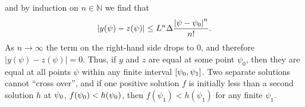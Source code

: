 %
and by induction on $n\in\mathbb{N}$ we find that 
%
\begin{equation}
  \left|y(\psi)-z(\psi)\right| 
  \le
  L^n\Delta\frac{\left|\psi-\psi_0\right|^n}{n!}.
\end{equation}
%
As $n\to\infty$ the term on the right-hand side drops to $0$, and
therefore $|y(\psi)-z(\psi)|=0$. Thus, if $y$ and $z$ are equal at
some point $\psi_0$, then they are equal at all points $\psi$ within
any finite interval $[\psi_0,\psi_1]$. Two separate solutions cannot
``cross over'', and if one positive solution $f$ is initially less than
a second solution $h$ at $\psi_0$, $f(\psi_0)<h(\psi_0)$, then
$f(\psi_1)<h(\psi_1)$ for any finite $\psi_1$.  

